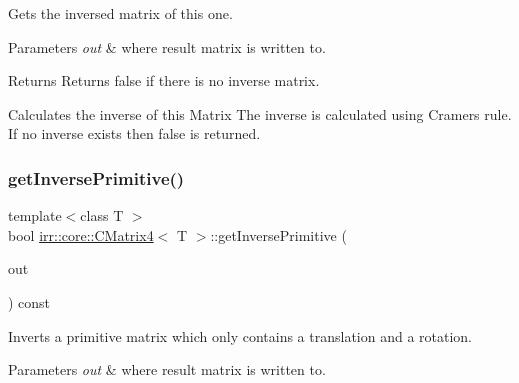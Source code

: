 Gets the inversed matrix of this one. 


\begin{DoxyParams}{Parameters}
{\em out} & where result matrix is written to. \\
\hline
\end{DoxyParams}
\begin{DoxyReturn}{Returns}
Returns false if there is no inverse matrix. 
\end{DoxyReturn}
Calculates the inverse of this Matrix The inverse is calculated using Cramers rule. If no inverse exists then \textquotesingle{}false\textquotesingle{} is returned. \mbox{\label{classirr_1_1core_1_1CMatrix4_aaeab6a8672ecc3d9790c8e7f141db795}} 
\subsubsection{\texorpdfstring{get\+Inverse\+Primitive()}{getInversePrimitive()}}
{\footnotesize\ttfamily template$<$class T $>$ \\
bool \hyperlink{classirr_1_1core_1_1CMatrix4}{irr\+::core\+::\+C\+Matrix4}$<$ T $>$\+::get\+Inverse\+Primitive (\begin{DoxyParamCaption}\item[{\hyperlink{classirr_1_1core_1_1CMatrix4}{C\+Matrix4}$<$ T $>$ \&}]{out }\end{DoxyParamCaption}) const\hspace{0.3cm}{\ttfamily [inline]}}



Inverts a primitive matrix which only contains a translation and a rotation. 


\begin{DoxyParams}{Parameters}
{\em out} & where result matrix is written to. \\
\hline
\end{DoxyParams}
\mbox{\label{classirr_1_1core_1_1CMatrix4_ad334281fcd12eb5acda020981706b759}} 
